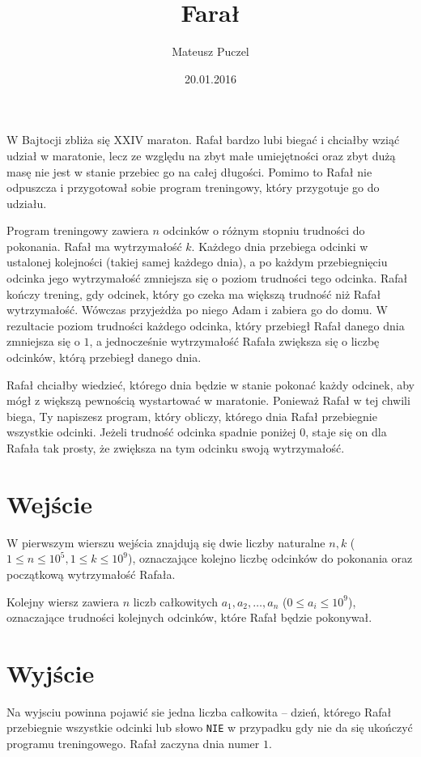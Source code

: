 \documentclass[zad,zawodnik,utf8]{sinol}
\title{Farał}
\author{Mateusz Puczel} %
\date{20.01.2016}
\begin{document}
  \begin{tasktext}%
W Bajtocji zbliża się XXIV maraton.
Rafał bardzo lubi biegać i chciałby wziąć udział w maratonie, lecz ze względu na zbyt małe umiejętności oraz zbyt dużą masę
nie jest w stanie przebiec go na całej długości. Pomimo to Rafał nie odpuszcza i przygotował sobie program treningowy, który przygotuje go
do udziału.

Program treningowy zawiera $n$ odcinków o różnym stopniu trudności do pokonania. Rafał ma wytrzymałość $k$. 
Każdego dnia przebiega odcinki w ustalonej kolejności (takiej samej każdego dnia), a po każdym przebiegnięciu odcinka jego wytrzymałość zmniejsza się o poziom trudności tego odcinka.
Rafał kończy trening, gdy odcinek, który go czeka ma większą trudność niż Rafał wytrzymałość.
Wówczas przyjeżdża po niego Adam i zabiera go do domu.
W rezultacie poziom trudności każdego odcinka, który przebiegł Rafał danego dnia zmniejsza
się o $1$, a jednocześnie wytrzymałość Rafała zwiększa się o liczbę odcinków, którą przebiegł danego dnia.

Rafał chciałby wiedzieć, którego dnia będzie w stanie pokonać każdy odcinek, aby mógł z większą pewnością wystartować w maratonie.
Ponieważ Rafał w tej chwili biega, Ty napiszesz program, który obliczy, którego dnia Rafał przebiegnie wszystkie odcinki.
Jeżeli trudność odcinka spadnie poniżej $0$, staje się on dla Rafała tak prosty, że zwiększa na tym odcinku swoją wytrzymałość.

  \section{Wejście}
W pierwszym wierszu wejścia znajdują się dwie liczby naturalne $n, k$ ($1 \leq n \leq 10^5, 1 \leq k \leq 10^9$), oznaczające kolejno liczbę odcinków do pokonania oraz początkową wytrzymałość Rafała.

Kolejny wiersz zawiera $n$ liczb całkowitych $a_1, a_2, \ldots, a_n$ ($0 \leq a_i \leq 10^9$), oznaczające trudności kolejnych odcinków, które Rafał będzie pokonywał.

  \section{Wyjście}
Na wyjsciu powinna pojawić sie jedna liczba całkowita -- dzień, którego Rafał przebiegnie wszystkie odcinki lub słowo \texttt{NIE} w przypadku gdy nie da się ukończyć programu treningowego. 
Rafał zaczyna dnia numer $1$.


\end{tasktext}
\end{document}
